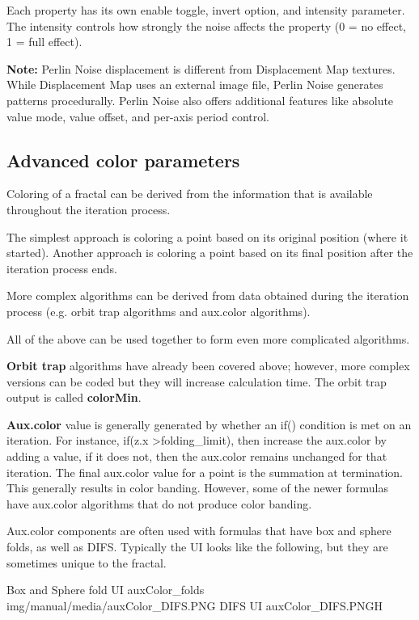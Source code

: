 Each property has its own enable toggle, invert option, and intensity parameter. The intensity controls how strongly the noise affects the property (0 = no effect, 1 = full effect).

\textbf{Note:} Perlin Noise displacement is different from Displacement Map textures. While Displacement Map uses an external image file, Perlin Noise generates patterns procedurally. Perlin Noise also offers additional features like absolute value mode, value offset, and per-axis period control.

\subsection{Advanced color parameters}\label{materials-advanced-color-parameters}

Coloring of a fractal can be derived from the information that is available throughout the iteration process.

The simplest approach is coloring a point based on its original position (where it started).
Another approach is coloring a point based on its final position after the iteration process ends.

More complex algorithms can be derived from data obtained during the iteration process (e.g. orbit trap algorithms and aux.color algorithms).

All of the above can be used together to form even more complicated algorithms.

\textbf{Orbit trap} algorithms have already been covered above; however, more complex versions can be coded but they will increase calculation time. The orbit trap output is called \textbf{colorMin}.

\textbf{Aux.color} value is generally generated by whether an if() condition is met on an iteration. For instance, if(z.x \textgreater\space folding\_limit), then increase the aux.color by adding a value, if it does not, then the aux.color remains unchanged for that iteration. The final aux.color value for a point is the summation at termination. This generally results in color banding. However, some of the newer formulas have aux.color algorithms that do not produce color banding.

Aux.color components are often used with formulas that have box and sphere folds, as well as DIFS. Typically the UI looks like the following, but they are sometimes unique to the fractal.

{Box and Sphere fold UI}
{auxColor_folds}
{img/manual/media/auxColor_DIFS.PNG}
{DIFS UI}
{auxColor_DIFS.PNG}{H}

